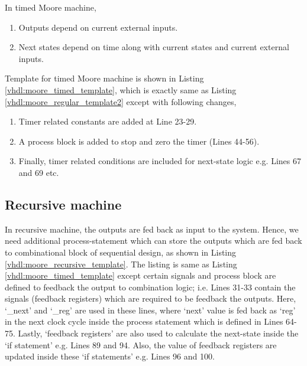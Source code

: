 \begin{noNumBox}
	In timed Moore machine, 
	\begin{enumerate}
		\item Outputs depend on current external inputs. 
		\item Next states depend on time along with current states and current external inputs.
	\end{enumerate}
\end{noNumBox}
Template for timed Moore machine is shown in Listing \ref{vhdl:moore_timed_template}, which is exactly same as Listing \ref{vhdl:moore_regular_template2} except with following changes, 
\begin{enumerate}
	\item Timer related constants are added at Line 23-29.
	\item A process block is added to stop and zero the timer (Lines 44-56). 
	\item Finally, timer related conditions are included for next-state logic e.g.  Lines 67 and 69 etc.
\end{enumerate}





\subsection{Recursive machine}
In recursive machine, the outputs are fed back as input to the system. Hence, we need additional process-statement which can store the outputs which are fed back to combinational block of sequential design, as shown in Listing \ref{vhdl:moore_recursive_template}. The listing is same as Listing \ref{vhdl:moore_timed_template} except certain signals and process block are defined to feedback the output to combination logic; i.e. Lines 31-33 contain the signals (feedback registers) which are required to be feedback the outputs. Here, `\_next' and `\_reg' are used in these lines, where `next' value is fed back as `reg' in the next clock cycle inside the process statement which is defined in Lines 64-75. Lastly, `feedback registers' are also used to calculate the next-state inside the `if statement' e.g. Lines 89 and 94. Also, the value of feedback registers are updated inside these `if statements' e.g. Lines 96 and 100. 

